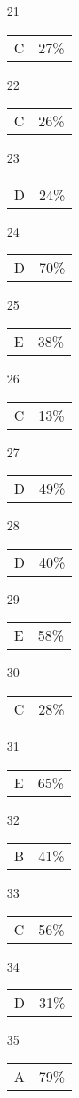 \documentclass[12pt]{article}
\begin{document}
\begin{multicols}{5}
\begin{enumerate}
\item[21] \begin{tabular}{cc} C & 27\%\end{tabular}
\item[22] \begin{tabular}{cc} C & 26\%\end{tabular}
\item[23] \begin{tabular}{cc} D & 24\%\end{tabular}
\item[24] \begin{tabular}{cc} D & 70\%\end{tabular}
\item[25] \begin{tabular}{cc} E & 38\%\end{tabular}
\item[]
\item[26] \begin{tabular}{cc} C & 13\%\end{tabular}
\item[27] \begin{tabular}{cc} D & 49\%\end{tabular}
\item[28] \begin{tabular}{cc} D & 40\%\end{tabular}
\item[29] \begin{tabular}{cc} E & 58\%\end{tabular}
\item[30] \begin{tabular}{cc} C & 28\%\end{tabular}
\item[]
\item[31] \begin{tabular}{cc} E & 65\%\end{tabular}
\item[32] \begin{tabular}{cc} B & 41\%\end{tabular}
\item[33] \begin{tabular}{cc} C & 56\%\end{tabular}
\item[34] \begin{tabular}{cc} D & 31\%\end{tabular}
\item[35] \begin{tabular}{cc} A & 79\%\end{tabular}

\end{enumerate}
\end{multicols}
\end{document}
